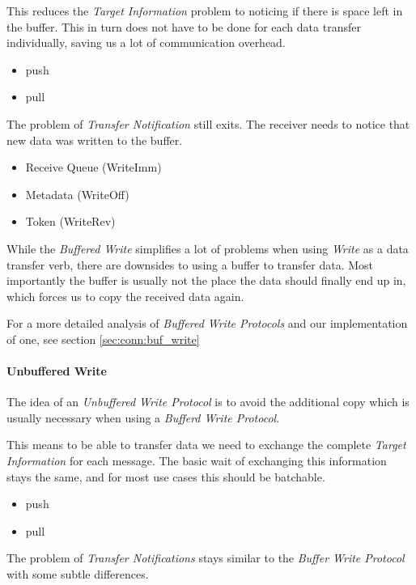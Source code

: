 This reduces the \emph{Target Information} problem to noticing if there is space left in the buffer. This in turn does not 
have to be done for each data transfer individually, saving us a lot of communication overhead.

\begin{itemize}
  \item push
  \item pull
\end{itemize}

The problem of \emph{Transfer Notification} still exits. The receiver needs to notice that new data was written to the buffer.

\begin{itemize}
  \item Receive Queue (WriteImm)
  \item Metadata (WriteOff)
  \item Token (WriteRev)
\end{itemize}

While the \emph{Buffered Write} simplifies a lot of problems when using \emph{Write} as a data transfer verb, there are 
downsides to using a buffer to transfer data. Most importantly the buffer is usually not the place the data should finally 
end up in, which forces us to copy the received data again.

For a more detailed analysis of \emph{Buffered Write Protocols} and our implementation of one, see section \ref{sec:conn:buf_write}


\paragraph{Unbuffered Write}
The idea of an \emph{Unbuffered Write Protocol} is to avoid the additional copy which is usually necessary when using a
\emph{Bufferd Write Protocol}. 

This means to be able to transfer data we need to exchange the complete \emph{Target Information} for each message. The basic
wait of exchanging this information stays the same, and for most use cases this should be batchable.

\begin{itemize}
  \item push
  \item pull
\end{itemize}

The problem of \emph{Transfer Notifications} stays similar to the \emph{Buffer Write Protocol} with some subtle differences.

